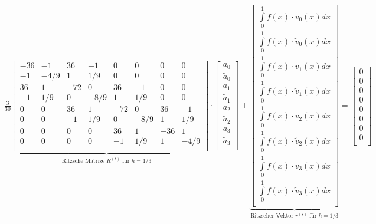 $\underset{\text{Ritzsche Matrize $R^{(8)}$ für } h=1/3}{\underbrace{\frac{3}{30}\begin{bmatrix}
	-36 & -1 & 36 & -1 & 0  & 0  & 0  & 0 \\
	-1  & -4/9  & 1  & 1/9  & 0  & 0  & 0  & 0\\
	36  & 1  & -72  & 0  & 36  & -1  & 0  & 0\\
	-1  & 1/9  & 0  & -8/9  & 1  & 1/9  & 0  & 0\\
	0  & 0  & 36  & 1  & -72  & 0  & 36  & -1\\
	0  & 0  & -1  & 1/9  & 0  & -8/9  & 1  & 1/9\\
	0  & 0  & 0  & 0  & 36  & 1  & -36  & 1\\
	0  & 0  & 0  & 0  & -1  & 1/9  & 1  & -4/9\\
\end{bmatrix}}}\cdot\begin{bmatrix}
	a_0\\
	\tilde{a}_0\\
	a_1\\
	\tilde{a}_1\\
	a_2\\
	\tilde{a}_2\\
	a_3\\
	\tilde{a}_3\\
\end{bmatrix}
+\underset{\text{Ritzscher Vektor $r^{(8)}$ für } h=1/3}{\underbrace{\begin{bmatrix}
	\int\limits_{0}^{1}{f(x)\cdot v_0(x)dx}\\
	\int\limits_{0}^{1}{f(x)\cdot \tilde{v}_0(x)dx}\\
	\int\limits_{0}^{1}{f(x)\cdot v_1(x)dx}\\
	\int\limits_{0}^{1}{f(x)\cdot \tilde{v}_1(x)dx}\\
	\int\limits_{0}^{1}{f(x)\cdot v_2(x)dx}\\
	\int\limits_{0}^{1}{f(x)\cdot \tilde{v}_2(x)dx}\\
	\int\limits_{0}^{1}{f(x)\cdot v_3(x)dx}\\
	\int\limits_{0}^{1}{f(x)\cdot \tilde{v}_3(x)dx}\\
\end{bmatrix}}}=
\begin{bmatrix}
	0\\
	0\\
	0\\
	0\\
	0\\
	0\\
	0\\
	0\\
\end{bmatrix}
$\\







